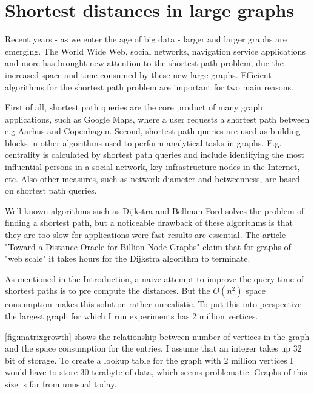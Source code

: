 \section{Shortest distances in large graphs}
Recent years - as we enter the age of big data - larger and larger graphs are
emerging. The World Wide Web, social networks, navigation service applications
and more has brought new attention to the shortest path problem, due the
increased space and time consumed by these new large graphs. Efficient
algorithms for the shortest path problem are important for two main reasons.

First of all, shortest path queries are the core product of many graph
applications, such as Google Maps, where a user requests a shortest path
between e.g Aarhus and Copenhagen.
Second, shortest path queries are used as building blocks in other algorithms
used to perform analytical tasks in graphs. E.g. centrality is calculated by
shortest path queries and include identifying the most influential persons in
a social network, key infrastructure nodes in the Internet, etc.
Also other measures, such as network diameter and betweenness, are based on
shortest path queries.

Well known algorithms such as Dijkstra and Bellman Ford solves the
problem of finding a shortest path, but a noticeable drawback of these
algorithms is that they are too slow for applications were fast results
are essential. The article "Toward a Distance Oracle for Billion-Node
Graphs"\cite{sp_billion_nodes} claim that for graphs of "web scale" it takes
hours for the Dijkstra algorithm to terminate.

As mentioned in the Introduction, a naive attempt to improve the query
time of shortest paths is to pre compute the distances. But the $O(n^2)$
space consumption makes this solution rather unrealistic. To put this into
perspective the largest graph for which I run experiments has 2 million
vertices.

\autoref{fig:matrixgrowth} shows the relationship between number of vertices
in the graph and the space consumption for the entries, I assume that an
integer takes up 32 bit of storage. To create a lookup table for the graph
with 2 million vertices I would have to store 30 terabyte of data, which seems
problematic. Graphs of this size is far from unusual today.

